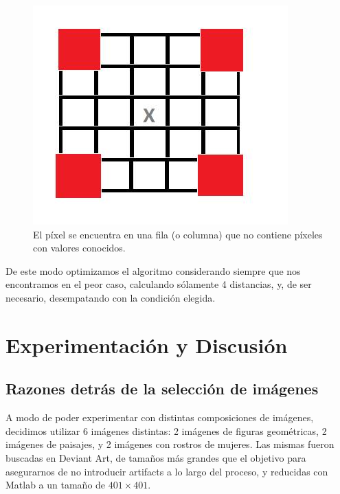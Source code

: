 \documentclass{article}
\begin{document}
\begin{itemize}
\begin{figure}[H]
\begin{center}
  \includegraphics[scale=0.25]{vecinos2}
  \caption{El píxel se encuentra en una fila (o columna) que no contiene píxeles con valores conocidos.}\label{fig:vecinos2}
\end{center}
\end{figure}
\end{itemize}

De este modo optimizamos el algoritmo considerando siempre que nos encontramos en el peor caso, calculando sólamente 4 distancias, y, de ser necesario, desempatando con la condición elegida.

\section{Experimentación y Discusión}

\subsection{Razones detrás de la selección de imágenes}

A modo de poder experimentar con distintas composiciones de imágenes, decidimos utilizar 6 imágenes distintas: 2 imágenes de figuras geométricas, 2 imágenes de paisajes, y 2 imágenes con rostros de mujeres. Las mismas fueron buscadas en Deviant Art, de tamaños más grandes que el objetivo para asegurarnos de no introducir artifacts a lo largo del proceso, y reducidas con Matlab a un tamaño de $401\times401$.
\end{document}
